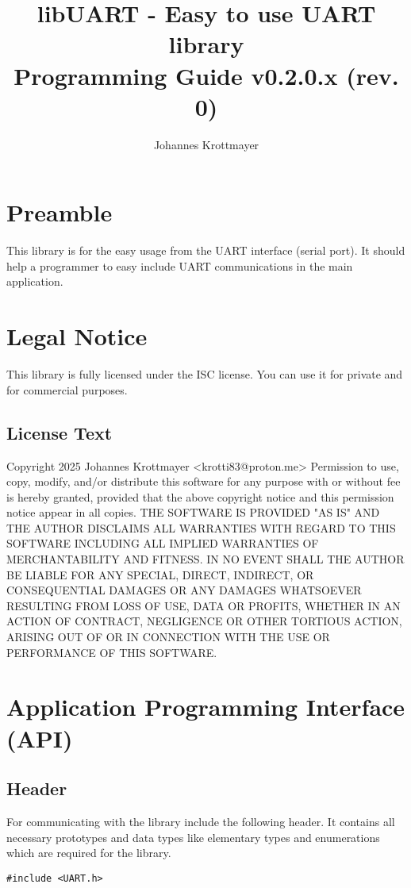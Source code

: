 \documentclass{report}
\title{libUART - Easy to use UART library \\ Programming Guide v0.2.0.x (rev. 0)}
\author{Johannes Krottmayer}
\begin{document}
\maketitle
\tableofcontents
\chapter{Preamble}
This library is for the easy usage from the UART interface (serial port). It should help
a programmer to easy include UART communications in the main application.
\chapter{Legal Notice}
This library is fully licensed under the ISC license. You can use it for private and
for commercial purposes.
\section{License Text}
Copyright 2025 Johannes Krottmayer <krotti83@proton.me>\newline
\newline
Permission to use, copy, modify, and/or distribute this software for any
purpose with or without fee is hereby granted, provided that the above
copyright notice and this permission notice appear in all copies.\newline
\newline
THE SOFTWARE IS PROVIDED "AS IS" AND THE AUTHOR DISCLAIMS ALL WARRANTIES
WITH REGARD TO THIS SOFTWARE INCLUDING ALL IMPLIED WARRANTIES OF
MERCHANTABILITY AND FITNESS. IN NO EVENT SHALL THE AUTHOR BE LIABLE FOR
ANY SPECIAL, DIRECT, INDIRECT, OR CONSEQUENTIAL DAMAGES OR ANY DAMAGES
WHATSOEVER RESULTING FROM LOSS OF USE, DATA OR PROFITS, WHETHER IN AN
ACTION OF CONTRACT, NEGLIGENCE OR OTHER TORTIOUS ACTION, ARISING OUT OF
OR IN CONNECTION WITH THE USE OR PERFORMANCE OF THIS SOFTWARE.
\chapter{Application Programming Interface (API)}
\section{Header}
For communicating with the library include the following header. It
contains all necessary prototypes and data types like elementary types
and enumerations which are required for the library.
\begin{lstlisting}
#include <UART.h>
\end{lstlisting}
\end{document}
